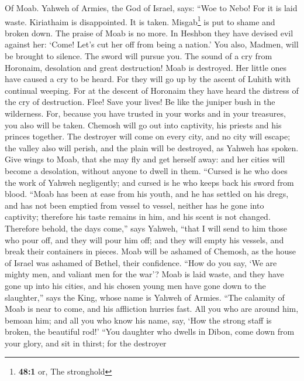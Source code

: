  Of Moab. Yahweh of Armies, the God of Israel, says: ``Woe
to Nebo! For it is laid waste. Kiriathaim is disappointed. It is taken.
Misgab\footnote{\textbf{48:1} or, The stronghold} is put to shame and
broken down.  The praise of Moab is no more. In Heshbon
they have devised evil against her: `Come! Let's cut her off from being
a nation.' You also, Madmen, will be brought to silence. The sword will
pursue you.  The sound of a cry from Horonaim, desolation
and great destruction!  Moab is destroyed. Her little ones
have caused a cry to be heard.  For they will go up by the
ascent of Luhith with continual weeping. For at the descent of Horonaim
they have heard the distress of the cry of destruction. 
Flee! Save your lives! Be like the juniper bush in the wilderness.
 For, because you have trusted in your works and in your
treasures, you also will be taken. Chemosh will go out into captivity,
his priests and his princes together.  The destroyer will
come on every city, and no city will escape; the valley also will
perish, and the plain will be destroyed, as Yahweh has spoken.
 Give wings to Moab, that she may fly and get herself
away: and her cities will become a desolation, without anyone to dwell
in them.  ``Cursed is he who does the work of Yahweh
negligently; and cursed is he who keeps back his sword from blood.
 ``Moab has been at ease from his youth, and he has
settled on his dregs, and has not been emptied from vessel to vessel,
neither has he gone into captivity; therefore his taste remains in him,
and his scent is not changed.  Therefore behold, the days
come,'' says Yahweh, ``that I will send to him those who pour off, and
they will pour him off; and they will empty his vessels, and break their
containers in pieces.  Moab will be ashamed of Chemosh,
as the house of Israel was ashamed of Bethel, their confidence.
 ``How do you say, `We are mighty men, and valiant men
for the war'?  Moab is laid waste, and they have gone up
into his cities, and his chosen young men have gone down to the
slaughter,'' says the King, whose name is Yahweh of Armies.
 ``The calamity of Moab is near to come, and his
affliction hurries fast.  All you who are around him,
bemoan him; and all you who know his name, say, `How the strong staff is
broken, the beautiful rod!'  ``You daughter who dwells in
Dibon, come down from your glory, and sit in thirst; for the destroyer
